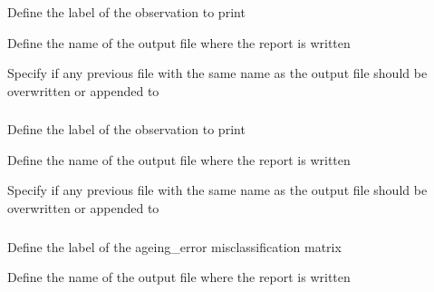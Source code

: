 \subsubsection[Print a summary of the an observation, including fits, and residuals]{}

 {Define the label of the observation to print}

 {Define the name of the output file where the report is written}

 {Specify if any previous file with the same name as the output file should be overwritten or appended to}

\subsubsection[Print a observation definition using simulated values]{}

 {Define the label of the observation to print}

 {Define the name of the output file where the report is written}

 {Specify if any previous file with the same name as the output file should be overwritten or appended to}

\subsubsection[Print an ageing error misclassification matrix]{}

 {Define the label of the ageing\_error misclassification matrix}

 {Define the name of the output file where the report is written}


